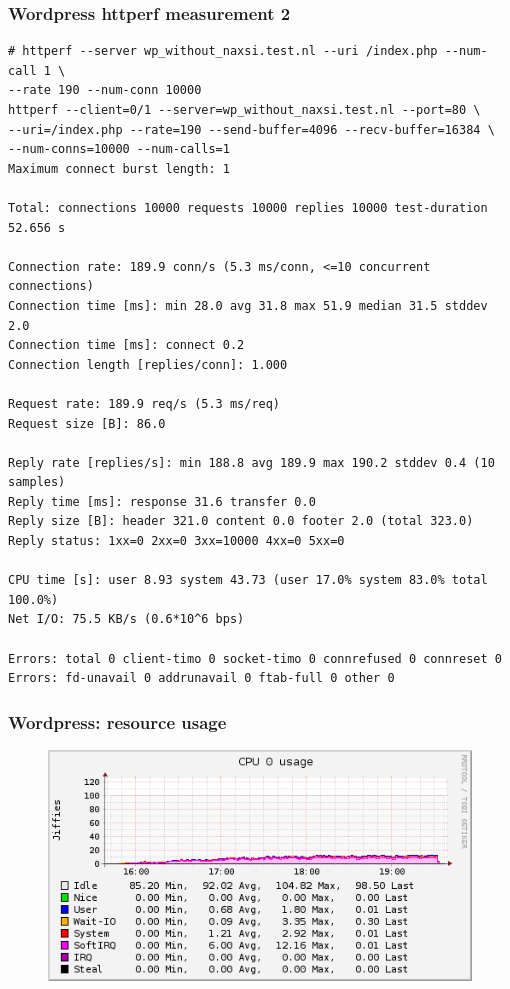 \documentclass[Measurement results]{subfiles}
\begin{document}
\subsubsection{Wordpress httperf measurement 2}
\label{sec:baseline_measurement_2}
\begin{verbatim}
# httperf --server wp_without_naxsi.test.nl --uri /index.php --num-call 1 \
--rate 190 --num-conn 10000
httperf --client=0/1 --server=wp_without_naxsi.test.nl --port=80 \
--uri=/index.php --rate=190 --send-buffer=4096 --recv-buffer=16384 \ 
--num-conns=10000 --num-calls=1
Maximum connect burst length: 1

Total: connections 10000 requests 10000 replies 10000 test-duration 52.656 s

Connection rate: 189.9 conn/s (5.3 ms/conn, <=10 concurrent connections)
Connection time [ms]: min 28.0 avg 31.8 max 51.9 median 31.5 stddev 2.0
Connection time [ms]: connect 0.2
Connection length [replies/conn]: 1.000

Request rate: 189.9 req/s (5.3 ms/req)
Request size [B]: 86.0

Reply rate [replies/s]: min 188.8 avg 189.9 max 190.2 stddev 0.4 (10 samples)
Reply time [ms]: response 31.6 transfer 0.0
Reply size [B]: header 321.0 content 0.0 footer 2.0 (total 323.0)
Reply status: 1xx=0 2xx=0 3xx=10000 4xx=0 5xx=0

CPU time [s]: user 8.93 system 43.73 (user 17.0% system 83.0% total 100.0%)
Net I/O: 75.5 KB/s (0.6*10^6 bps)

Errors: total 0 client-timo 0 socket-timo 0 connrefused 0 connreset 0
Errors: fd-unavail 0 addrunavail 0 ftab-full 0 other 0
\end{verbatim}

\newpage
\subsubsection{Wordpress: resource usage}
\label{sec:Wordpress baseline resource usage}
\begin{figure}[H]
\centering
\includegraphics[scale=0.7]{images/results/baseline_wp/cpu.png}
\end{figure}
\end{document}
